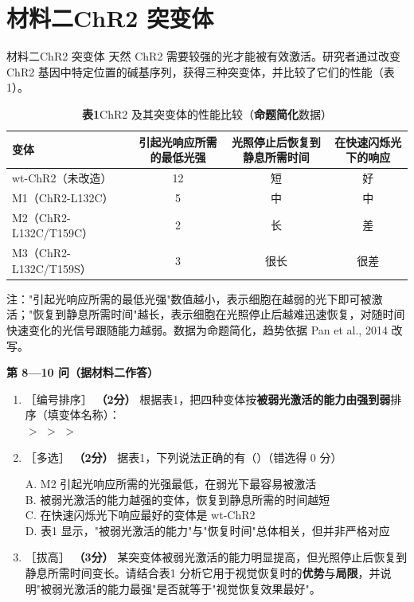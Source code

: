 \documentclass[UTF8,a4paper,11pt]{ctexart}
\newcommand{\pt}[1]{\textbf{（#1分）}}
\newcommand{\lv}[1]{{\small\color{deepgreen}［#1］}}
\newcommand{\key}[1]{\textbf{\color{deepred}#1}}
\newcommand{\tian}[1]{\underline{\hspace{#1}}}
\newcommand{\choice}[1]{\par\smallskip\noindent #1\par}
\begin{document}
\section{材料二\quad ChR2 突变体}

\begin{matbox}{材料二\quad ChR2 突变体}
天然 ChR2 需要较强的光才能被有效激活。研究者通过改变 ChR2 基因中特定位置的碱基序列，获得三种突变体，并比较了它们的性能（表1）。
\end{matbox}

\begin{table}[H]
\centering\small
\caption*{\textbf{表1}\quad ChR2 及其突变体的性能比较（\key{命题简化}数据）}
\begin{tabular}{@{}lccc@{}}
\toprule
\textbf{变体} & \textbf{引起光响应所需的最低光强} & \textbf{光照停止后恢复到静息所需时间} & \textbf{在快速闪烁光下的响应} \\
\midrule
wt-ChR2（未改造） & 12 & 短 & 好 \\
M1（ChR2-L132C） & 5 & 中 & 中 \\
M2（ChR2-L132C/T159C） & 2 & 长 & 差 \\
M3（ChR2-L132C/T159S） & 3 & 很长 & 很差 \\
\bottomrule
\end{tabular}

\smallskip
\parbox{0.94\textwidth}{\footnotesize 注："引起光响应所需的最低光强"数值越小，表示细胞在越弱的光下即可被激活；"恢复到静息所需时间"越长，表示细胞在光照停止后越难迅速恢复，对随时间快速变化的光信号跟随能力越弱。数据为命题简化，趋势依据 Pan et al., 2014 改写。}
\end{table}

\begin{qbox}
\noindent\textbf{\color{deepgreen}第 8—10 问（据材料二作答）}
\begin{enumerate}[leftmargin=2.2em,itemsep=5pt,start=8]
\item \lv{编号排序} \pt{2} 根据表1，把四种变体按\textbf{被弱光激活的能力由强到弱}排序（填变体名称）：\\
\tian{2.4cm} $>$ \tian{2.4cm} $>$ \tian{2.4cm} $>$ \tian{2.4cm}

\item \lv{多选} \pt{2} 据表1，下列说法正确的有（\quad）（错选得 0 分）\\
\choice{A. M2 引起光响应所需的光强最低，在弱光下最容易被激活\\
B. 被弱光激活的能力越强的变体，恢复到静息所需的时间越短\\
C. 在快速闪烁光下响应最好的变体是 wt-ChR2\\
D. 表1 显示，"被弱光激活的能力"与"恢复时间"总体相关，但并非严格对应}

\item \lv{拔高} \pt{3} 某突变体被弱光激活的能力明显提高，但光照停止后恢复到静息所需时间变长。请结合表1 分析它用于视觉恢复时的\textbf{优势}与\textbf{局限}，并说明"被弱光激活的能力最强"是否就等于"视觉恢复效果最好"。
\end{enumerate}
\end{qbox}
\end{document}
